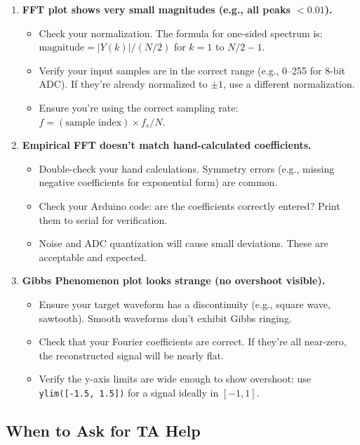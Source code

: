 \documentclass[11pt,letterpaper]{article}
\begin{document}
\begin{enumerate}
    \item \textbf{FFT plot shows very small magnitudes (e.g., all peaks $< 0.01$).}
    \begin{itemize}
        \item Check your normalization. The formula for one-sided spectrum is: $\text{magnitude} = |Y(k)| / (N/2)$ for $k = 1$ to $N/2-1$.
        \item Verify your input samples are in the correct range (e.g., 0--255 for 8-bit ADC). If they're already normalized to $\pm 1$, use a different normalization.
        \item Ensure you're using the correct sampling rate: $f = (\text{sample index}) \times f_s / N$.
    \end{itemize}

    \item \textbf{Empirical FFT doesn't match hand-calculated coefficients.}
    \begin{itemize}
        \item Double-check your hand calculations. Symmetry errors (e.g., missing negative coefficients for exponential form) are common.
        \item Check your Arduino code: are the coefficients correctly entered? Print them to serial for verification.
        \item Noise and ADC quantization will cause small deviations. These are acceptable and expected.
    \end{itemize}

    \item \textbf{Gibbs Phenomenon plot looks strange (no overshoot visible).}
    \begin{itemize}
        \item Ensure your target waveform has a discontinuity (e.g., square wave, sawtooth). Smooth waveforms don't exhibit Gibbs ringing.
        \item Check that your Fourier coefficients are correct. If they're all near-zero, the reconstructed signal will be nearly flat.
        \item Verify the y-axis limits are wide enough to show overshoot: use \texttt{ylim([-1.5, 1.5])} for a signal ideally in $[-1, 1]$.
    \end{itemize}
\end{enumerate}

\subsection*{When to Ask for TA Help}
\end{document}
